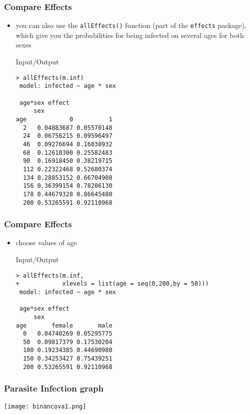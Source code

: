 \begin{frame}[fragile]\frametitle{Compare Effects}
\begin{itemize}
\item you can also use the \texttt{allEffects()} function (part of the \texttt{effects} package), which give you the probabilities for being infected on several ages for both sexes
  \begin{exampleblock}{Input/Output}\scriptsize
\begin{verbatim}
> allEffects(m.inf)
 model: infected ~ age * sex

 age*sex effect
     sex
age            0          1
  2   0.04883687 0.05570148
  24  0.06756215 0.09596497
  46  0.09276694 0.16038932
  68  0.12610300 0.25582483
  90  0.16918450 0.38219715
  112 0.22322468 0.52680374
  134 0.28853152 0.66704908
  156 0.36399154 0.78286130
  178 0.44679328 0.86645480
  200 0.53265591 0.92110968
\end{verbatim}
  \end{exampleblock}

\end{itemize}
\end{frame}


\begin{frame}[fragile]\frametitle{Compare Effects}
\begin{itemize}
\item choose values of age
  \begin{exampleblock}{Input/Output}\footnotesize
\begin{verbatim}
> allEffects(m.inf,
+            xlevels = list(age = seq(0,200,by = 50)))
 model: infected ~ age * sex

 age*sex effect
     sex
age       female       male
  0   0.04740269 0.05295775
  50  0.09817379 0.17530204
  100 0.19234385 0.44690980
  150 0.34253427 0.75439251
  200 0.53265591 0.92110968
\end{verbatim}
  \end{exampleblock}

\end{itemize}
\end{frame}

\begin{frame}[fragile]\frametitle{Parasite Infection graph}
\begin{center}
\texttt{[image: binancova1.png]}
\end{center}
\end{frame}


